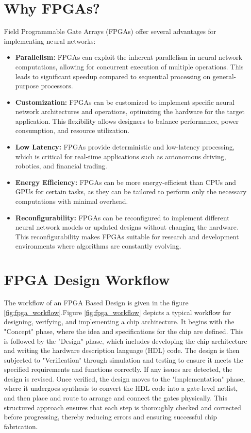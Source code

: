 \documentclass{report}
\begin{document}
\section{Why FPGAs?}
Field Programmable Gate Arrays (FPGAs) offer several advantages for implementing neural networks:
\begin{itemize}
    \item \textbf{Parallelism:} FPGAs can exploit the inherent parallelism in neural network computations, allowing for concurrent execution of multiple operations. This leads to significant speedup compared to sequential processing on general-purpose processors.
    \item \textbf{Customization:} FPGAs can be customized to implement specific neural network architectures and operations, optimizing the hardware for the target application. This flexibility allows designers to balance performance, power consumption, and resource utilization.
    \item \textbf{Low Latency:} FPGAs provide deterministic and low-latency processing, which is critical for real-time applications such as autonomous driving, robotics, and financial trading.
    \item \textbf{Energy Efficiency:} FPGAs can be more energy-efficient than CPUs and GPUs for certain tasks, as they can be tailored to perform only the necessary computations with minimal overhead.
    \item \textbf{Reconfigurability:} FPGAs can be reconfigured to implement different neural network models or updated designs without changing the hardware. This reconfigurability makes FPGAs suitable for research and development environments where algorithms are constantly evolving.
\end{itemize}

\section{FPGA Design Workflow}
The workflow of an FPGA Based Design\cite{fpga_workflow} is given in the figure \ref{fig:fpga_workflow}.Figure \ref{fig:fpga_workflow} depicts a typical workflow for designing, verifying, and implementing a chip architecture. It begins with the "Concept" phase, where the idea and specifications for the chip are defined. This is followed by the "Design" phase, which includes developing the chip architecture and writing the hardware description language (HDL) code. The design is then subjected to "Verification" through simulation and testing to ensure it meets the specified requirements and functions correctly. If any issues are detected, the design is revised. Once verified, the design moves to the "Implementation" phase, where it undergoes synthesis to convert the HDL code into a gate-level netlist, and then place and route to arrange and connect the gates physically. This structured approach ensures that each step is thoroughly checked and corrected before progressing, thereby reducing errors and ensuring successful chip fabrication.
 
\end{document}
